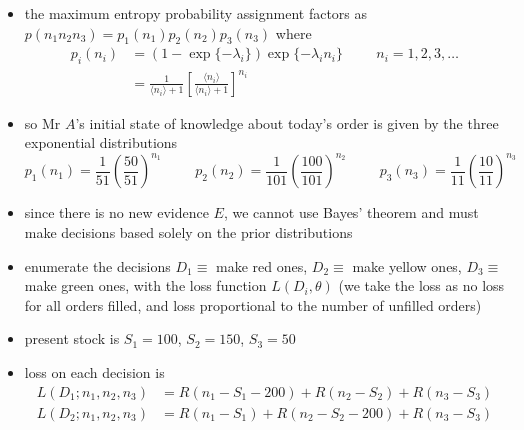 \documentclass[../jaynes_prob_theory_notes.tex]{subfiles}
\begin{document}
\begin{itemize}
\begin{equation*}
                            \end{equation*}
                        \item the maximum entropy probability assignment factors as \(p(n_1 n_2 n_3) = p_1(n_1)p_2(n_2)p_3(n_3)\) where
                            \begin{align*} 
                                p_i(n_i) &= (1 - \exp \{-\lambda_i\})\exp \{-\lambda_i n_i\} \hspace{1cm} n_i = 1, 2, 3, \ldots \\
                                         &= \frac{1}{\langle n_i \rangle + 1} {\left[ \frac{\langle n_i \rangle}{\langle n_i \rangle + 1} \right]}^{n_i}
                            \end{align*}
                        \item so Mr \(A\)'s initial state of knowledge about today's order is given by the three exponential distributions
                            \begin{equation*} 
                                p_1(n_1) = \frac{1}{51} {\left( \frac{50}{51} \right)}^{n_1} \hspace{1cm} p_2(n_2) = \frac{1}{101} {\left( \frac{100}{101} \right)}^{n_2} \hspace{1cm} p_3(n_3) = \frac{1}{11} {\left( \frac{10}{11} \right)}^{n_3}
                            \end{equation*}
                        \item since there is no new evidence \(E\), we cannot use Bayes' theorem and must make decisions based solely on the prior distributions
                        \item enumerate the decisions \(D_1 \equiv\) make red ones, \(D_2 \equiv\) make yellow ones, \(D_3 \equiv\) make green ones, with the loss function \(L(D_i, \theta)\) (we take the loss as no loss for all orders filled, and loss proportional to the number of unfilled orders)
                        \item present stock is \(S_1 = 100\), \(S_2 = 150\), \(S_3 = 50\)
                        \item loss on each decision is
                            \begin{align*} 
                                L(D_1; n_1, n_2, n_3) &= R(n_1 - S_1 - 200) + R(n_2 - S_2) + R(n_3 - S_3) \\
                                L(D_2; n_1, n_2, n_3) &= R(n_1 - S_1) + R(n_2 - S_2 - 200) + R(n_3 - S_3) \\

\end{align*}
\end{itemize}
\end{document}
